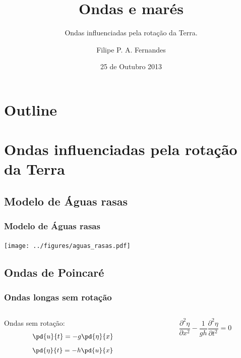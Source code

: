 \title[Aula 07]{Ondas e marés}
\subtitle{Ondas influenciadas pela rotação da Terra.}
\author[Filipe Fernandes]{Filipe P. A. Fernandes}
\date[Outubro 2013]{25 de Outubro 2013}




\begin{frame}[plain]
  \titlepage
\end{frame}

\section*{Outline}
\begin{frame}
\tableofcontents
\end{frame}

\section{Ondas influenciadas pela rotação da Terra}
\subsection{Modelo de Águas rasas}
\begin{frame}
  \frametitle{Modelo de Águas rasas}
  \begin{center}
    \texttt{[image: ../figures/aguas\_rasas.pdf]}
  \end{center}
\end{frame}

\subsection{Ondas de Poincaré}
\begin{frame}
\frametitle{Ondas longas sem rotação}
  \begin{columns}
    \begin{column}{0.5\textwidth}
    \begin{block}{}
      Ondas sem rotação:
      \[
        \pd{u}{t} = -g\pd{\eta}{x}
      \]
      \[
        \pd{\eta}{t} = -h\pd{u}{x}
      \]
    \end{block}
    \end{column}
    \begin{column}{0.5\textwidth}
    \begin{block}{}
      \[
        \frac{\partial^2\eta}{\partial x^2} - \frac{1}{gh}\frac{\partial^2\eta}{\partial{t^2}} = 0
      \]
    \end{block}
    \end{column}
  \end{columns}
\end{frame}

